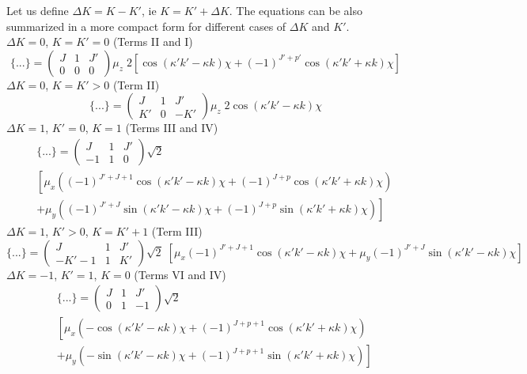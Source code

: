 Let us define $\Delta K = K - K'$, ie $K = K'+\Delta K$.
The equations can be also summarized in a more compact form for different cases of $\Delta K$ and $K'$. \\
$\Delta K = 0$, $K = K'= 0$ (Terms II and I)
\begin{equation}
\{...\} = 
\left( \begin{array}{ccc} 
 J &  1 &  J' \\
 0 &  0 &  0   \end{array} \right)
\mu_z \; 2  \left[ 
\cos ( \kappa' k' - \kappa k) \chi
 + (-1)^{J'+p'} \cos ( \kappa' k' + \kappa k) \chi \right]
\end{equation}
$\Delta K = 0$, $K = K' > 0$ (Term II)
\begin{equation}
\{...\} = 
\left( \begin{array}{ccc} 
 J  &  1 &  J' \\
 K' &  0 & -K'  \end{array} \right)
\mu_z \; 2  \cos ( \kappa' k' - \kappa k) \chi
\end{equation}
$\Delta K = 1$, $K'= 0$, $K= 1$ (Terms III and IV)
\begin{eqnarray} \nonumber
&&\{...\} = 
\left( \begin{array}{ccc} 
 J &  1 &  J' \\
-1 &  1 &  0   \end{array} \right)
\sqrt{2} \;   \\ \nonumber
&& \left[ \mu_x \left(
(-1)^{J'+J+1} \cos ( \kappa' k' - \kappa k) \chi +
(-1)^{J+p} \cos ( \kappa' k' + \kappa k) \chi \right) \right. \\
&& \left. + \mu_y \left(
(-1)^{J'+J} \sin ( \kappa' k' - \kappa k) \chi +
(-1)^{J+p} \sin ( \kappa' k' + \kappa k) \chi \right)
\right]
\end{eqnarray}
$\Delta K = 1$, $K'> 0$, $K=K'+1$ (Term III)
\begin{equation}
\{...\} = 
\left( \begin{array}{ccc} 
 J    &  1 &  J' \\
-K'-1 &  1 &  K'  \end{array} \right)
\sqrt{2} \; \left[ \mu_x  (-1)^{J'+J+1} \cos ( \kappa' k' - \kappa k) \chi 
+ \mu_y  (-1)^{J'+J} \sin ( \kappa' k' - \kappa k) \chi  \right]
\end{equation}
$\Delta K = -1$, $K'= 1$, $K= 0$ (Terms VI and IV)
\begin{eqnarray} \nonumber
&&\{...\} = 
\left( \begin{array}{ccc} 
 J &  1 &  J' \\
 0 &  1 & -1   \end{array} \right)
\sqrt{2} \; \\ \nonumber
&& \left[ \mu_x  \left(
- \cos ( \kappa' k' - \kappa k) \chi +
(-1)^{J+p+1} \cos ( \kappa' k' + \kappa k) \chi \right) \right. \\ 
&& \left. + \mu_y  \left(
- \sin ( \kappa' k' - \kappa k) \chi +
(-1)^{J+p+1} \sin ( \kappa' k' + \kappa k) \chi \right)
\right]
\end{eqnarray}
